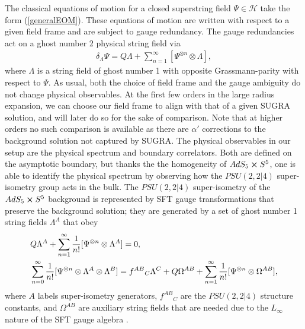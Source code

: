 \documentclass[12pt]{article}
\def\ie{\begin{equation}\begin{aligned}}
\def\fe{\end{aligned}\end{equation}}
\numberwithin{equation}{section}
\begin{document}
The classical equations of motion for a closed superstring field $\Psi\in\mathcal{H}$ take the form (\ref{generalEOM}). These equations of motion are written with respect to a given field frame and are subject to gauge redundancy. The gauge redundancies act on a ghost number 2 physical string field via
\ie\label{gaugepsi}
\delta_\Lambda \Psi = Q \Lambda + \sum\limits_{n=1}^\infty [\Psi^{\otimes n}\otimes \Lambda],
\fe
where $\Lambda$ is a string field of ghost number 1 with opposite Grassmann-parity with respect to $\Psi$. As usual, both the choice of field frame \cite{Hata:1993gf} and the gauge ambiguity do not change physical observables. At the first few orders in the large radius expansion, we can choose our field frame to align with that of a given SUGRA solution, and will later do so for the sake of comparison. Note that at higher orders no such comparison is available as there are $\alpha'$ corrections to the background solution not captured by SUGRA. The physical observables in our setup are the physical spectrum and boundary correlators. Both are defined on the asymptotic boundary, but thanks the the homogeneity of $AdS_5 \cross S^5$, one is able to identify the physical spectrum by observing how the $PSU(2,2|4)$ super-isometry group acts in the bulk.  The $PSU(2,2|4)$ super-isometry of the $AdS_5 \cross S^5$ background is represented by SFT gauge transformations that preserve the background solution; they are generated by a set of ghost number 1 string fields $\Lambda^A$ that obey
\ie{}
& Q \Lambda^A + \sum_{n=1}^\infty {1\over n!} [\Psi^{\otimes n}\otimes \Lambda^A] = 0,
\\
&\sum_{n=0}^\infty {1\over n!}  [\Psi^{\otimes n}\otimes \Lambda^A\otimes \Lambda^B ] = f^{AB}{}_C \Lambda^C + Q \Omega^{AB} + \sum_{n=1}^\infty {1\over n!} [\Psi^{\otimes n}\otimes \Omega^{AB}] ,
\label{superiso}
\fe
where $A$ labels super-isometry generators, $f^{AB}{}_C$ are the $PSU(2,2|4)$ structure constants, and $\Omega^{AB}$ are auxiliary string fields that are needed due to the $L_\infty$ nature of the SFT gauge algebra \cite{Hohm:2017pnh, Mazel:2025fxj}.
\end{document}
